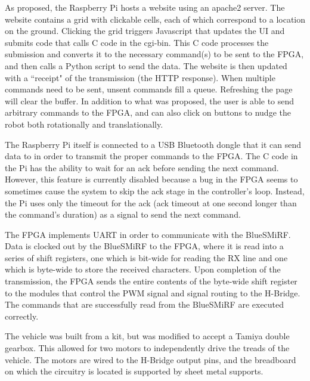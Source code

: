 \documentclass[12pt]{article}
\begin{document}
As proposed, the Raspberry Pi hosts a website using an apache2 server.  The website contains a grid with clickable cells, each of which correspond to a location on the ground. Clicking the grid triggers Javascript that updates the UI and submits code that calls C code in the cgi-bin.  This C code processes the submission and converts it to the necessary command(s) to be sent to the FPGA, and then calls a Python script to send the data.  The website is then updated with a ``receipt" of the transmission (the HTTP response).  When multiple commands need to be sent, unsent commands fill a queue.  Refreshing the page will clear the buffer.  In addition to what was proposed, the user is able to send arbitrary commands to the FPGA, and can also click on buttons to nudge the robot both rotationally and translationally.

The Raspberry Pi itself is connected to a USB Bluetooth dongle that it can send data to in order to transmit the proper commands to the FPGA.  The C code in the Pi has the ability to wait for an ack before sending the next command.  However, this feature is currently disabled because a bug in the FPGA seems to sometimes cause the system to skip the ack stage in the controller's loop.  Instead, the Pi uses only the timeout for the ack (ack timeout at one second longer than the command's duration) as a signal to send the next command.

The FPGA implements UART in order to communicate with the BlueSMiRF.  Data is clocked out by the BlueSMiRF to the FPGA, where it is read into a series of shift registers, one which is bit-wide for reading the RX line and one which is byte-wide to store the received characters.  Upon completion of the transmission, the FPGA sends the entire contents of the byte-wide shift register to the modules that control the PWM signal and signal routing to the H-Bridge.  The commands that are successfully read from the BlueSMiRF are executed correctly.

The vehicle was built from a kit, but was modified to accept a Tamiya double gearbox.  This allowed for two motors to independently drive the treads of the vehicle.  The motors are wired to the H-Bridge output pins, and the breadboard on which the circuitry is located is supported by sheet metal supports.

\end{document}
